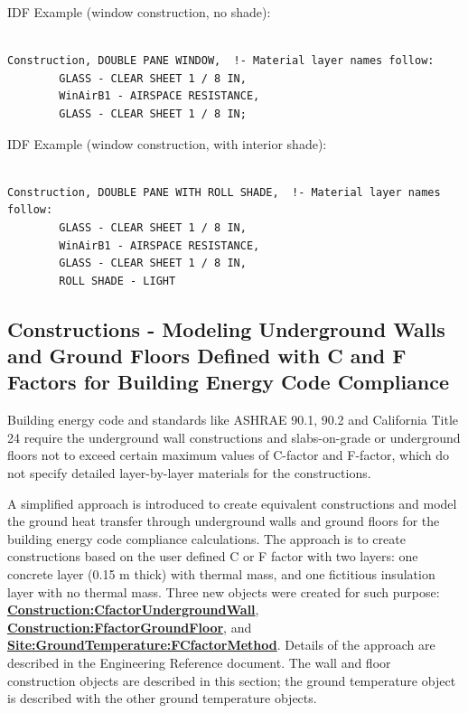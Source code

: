 IDF Example (window construction, no shade):

\begin{lstlisting}

Construction, DOUBLE PANE WINDOW,  !- Material layer names follow:
        GLASS - CLEAR SHEET 1 / 8 IN,
        WinAirB1 - AIRSPACE RESISTANCE,
        GLASS - CLEAR SHEET 1 / 8 IN;
\end{lstlisting}

IDF Example (window construction, with interior shade):

\begin{lstlisting}

Construction, DOUBLE PANE WITH ROLL SHADE,  !- Material layer names follow:
        GLASS - CLEAR SHEET 1 / 8 IN,
        WinAirB1 - AIRSPACE RESISTANCE,
        GLASS - CLEAR SHEET 1 / 8 IN,
        ROLL SHADE - LIGHT
\end{lstlisting}

\subsection{Constructions - Modeling Underground Walls and Ground Floors Defined with C and F Factors for Building Energy Code Compliance}\label{constructions---modeling-underground-walls-and-ground-floors-defined-with-c-and-f-factors-for-building-energy-code-compliance}

Building energy code and standards like ASHRAE 90.1, 90.2 and California Title 24 require the underground wall constructions and slabs-on-grade or underground floors not to exceed certain maximum values of C-factor and F-factor, which do not specify detailed layer-by-layer materials for the constructions.

A simplified approach is introduced to create equivalent constructions and model the ground heat transfer through underground walls and ground floors for the building energy code compliance calculations. The approach is to create constructions based on the user defined C or F factor with two layers: one concrete layer (0.15 m thick) with thermal mass, and one fictitious insulation layer with no thermal mass. Three new objects were created for such purpose: \textbf{\hyperref[constructioncfactorundergroundwall]{Construction:CfactorUndergroundWall}}, \textbf{\hyperref[constructionffactorgroundfloor]{Construction:FfactorGroundFloor}}, and \textbf{\hyperref[sitegroundtemperaturefcfactormethod]{Site:GroundTemperature:FCfactorMethod}}. Details of the approach are described in the Engineering Reference document. The wall and floor construction objects are described in this section; the ground temperature object is described with the other ground temperature objects.

